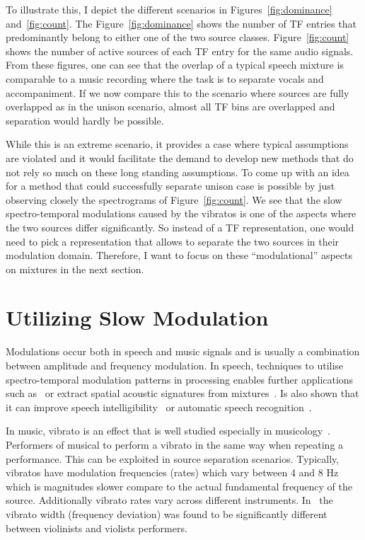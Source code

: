 To illustrate this, I depict the different scenarios in Figures~\ref{fig:dominance} and~\ref{fig:count}.
The Figure~\ref{fig:dominance} shows the number of TF entries that predominantly belong to either one of the two source classes.
Figure~\ref{fig:count} shows the number of active sources of each TF entry for the same audio signals.
From these figures, one can see that the overlap of a typical speech mixture is comparable to a music recording where the task is to separate vocals and accompaniment.
If we now compare this to the scenario where sources are fully overlapped as in the unison scenario, almost all TF bins are overlapped and separation would hardly be possible.
\par
While this is an extreme scenario, it provides a case where typical assumptions are violated and it would facilitate the demand to develop new methods that do not rely so much on these long standing assumptions.
To come up with an idea for a method that could successfully separate unison case is possible by just observing closely the spectrograms of Figure~\ref{fig:count}.
We see that the slow spectro-temporal modulations caused by the vibratos is one of the aspects where the two sources differ significantly.
So instead of a TF representation, one would need to pick a representation that allows to separate the two sources in their modulation domain.
Therefore, I want to focus on these ``modulational'' aspects on mixtures in the next section.

\hypertarget{utilizing-slow-modulations}{%
\section{Utilizing Slow Modulation}\label{utilizing-slow-modulations}}

Modulations occur both in speech and music signals and is usually a combination between amplitude and frequency modulation.
In speech, techniques to utilise spectro-temporal modulation patterns in processing enables further applications such as~\cite{mesgarani04} or extract spatial acoustic signatures from mixtures~\cite{sukittanon06}.
Is also shown that it can improve speech intelligibility~\cite{elhilali03} or automatic speech recognition~\cite{kingsbury98}.

In music, vibrato is an effect that is well studied especially in musicology~\cite{A, B, C, D, E}.
Performers of musical to perform a vibrato in the same way when repeating a performance. This can be exploited in
source separation scenarios.
Typically, vibratos have modulation frequencies (rates) which vary between 4 and 8 Hz which is magnitudes slower compare to the actual fundamental frequency of the source.
Additionally vibrato rates vary across different instruments.
In~\cite{macleod2006} the vibrato width (frequency deviation) was found to be significantly different between violinists and violists performers.\\

